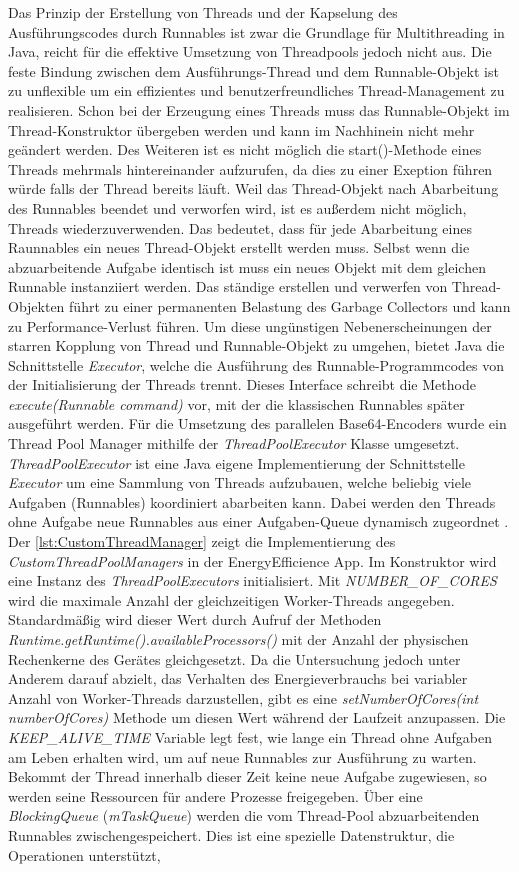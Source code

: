 Das Prinzip der Erstellung von Threads und der Kapselung des Ausführungscodes durch Runnables ist zwar die Grundlage für Multithreading in Java, reicht für die effektive Umsetzung von Threadpools jedoch nicht aus. Die feste Bindung zwischen dem Ausführungs-Thread und dem Runnable-Objekt ist zu unflexible um ein effizientes und benutzerfreundliches Thread-Management zu realisieren. Schon bei der Erzeugung eines Threads muss das Runnable-Objekt im Thread-Konstruktor übergeben werden und kann im Nachhinein nicht mehr geändert werden. Des Weiteren ist es nicht möglich die start()-Methode eines Threads mehrmals hintereinander aufzurufen, da dies zu einer Exeption führen würde falls der Thread bereits läuft. Weil das Thread-Objekt nach Abarbeitung des Runnables beendet und verworfen wird, ist es außerdem nicht möglich, Threads wiederzuverwenden. Das bedeutet, dass für jede Abarbeitung eines Raunnables ein neues Thread-Objekt erstellt werden muss. Selbst wenn die abzuarbeitende Aufgabe identisch ist muss ein neues Objekt mit dem gleichen Runnable instanziiert werden. Das ständige erstellen und verwerfen von Thread-Objekten führt zu einer permanenten Belastung des Garbage Collectors und kann zu Performance-Verlust führen. Um diese ungünstigen Nebenerscheinungen der starren Kopplung von Thread und Runnable-Objekt zu umgehen, bietet Java die Schnittstelle \emph{Executor}, welche die Ausführung des Runnable-Programmcodes von der Initialisierung der Threads trennt. Dieses Interface schreibt die Methode \emph{execute(Runnable command)} vor,  mit der die klassischen Runnables später ausgeführt werden. Für die Umsetzung des parallelen Base64-Encoders wurde ein Thread Pool Manager mithilfe der \emph{ThreadPoolExecutor} Klasse umgesetzt. \emph{ThreadPoolExecutor} ist eine Java eigene Implementierung der Schnittstelle \emph{Executor} um eine Sammlung von Threads aufzubauen, welche beliebig viele  Aufgaben (Runnables) koordiniert abarbeiten kann. Dabei werden den Threads ohne Aufgabe neue Runnables aus einer Aufgaben-Queue dynamisch zugeordnet \cite{javaistauchnurInsel}. Der \autoref{lst:CustomThreadManager} zeigt die Implementierung des \emph{ CustomThreadPoolManagers} in der \glqq EnergyEfficience\grqq{} App. Im Konstruktor wird eine Instanz des \emph{ThreadPoolExecutors} initialisiert. Mit \emph{NUMBER\_OF\_CORES} wird die maximale Anzahl der gleichzeitigen Worker-Threads angegeben. Standardmäßig wird dieser Wert durch Aufruf der Methoden \emph{Runtime.getRuntime().availableProcessors()} mit der Anzahl der physischen Rechenkerne des Gerätes gleichgesetzt. Da die Untersuchung jedoch unter Anderem darauf abzielt, das Verhalten des Energieverbrauchs bei variabler Anzahl von Worker-Threads darzustellen, gibt es eine  \emph{ setNumberOfCores(int numberOfCores)} Methode um  diesen Wert während der Laufzeit anzupassen. Die \emph{ KEEP\_ALIVE\_TIME} Variable legt fest, wie lange ein Thread ohne Aufgaben am Leben erhalten wird, um auf neue Runnables zur Ausführung zu warten. Bekommt der Thread innerhalb dieser Zeit keine neue Aufgabe zugewiesen, so werden seine Ressourcen für andere Prozesse freigegeben. Über eine \emph{ BlockingQueue} (\emph{mTaskQueue}) werden die vom Thread-Pool abzuarbeitenden Runnables zwischengespeichert. Dies ist eine spezielle Datenstruktur, die Operationen unterstützt, 